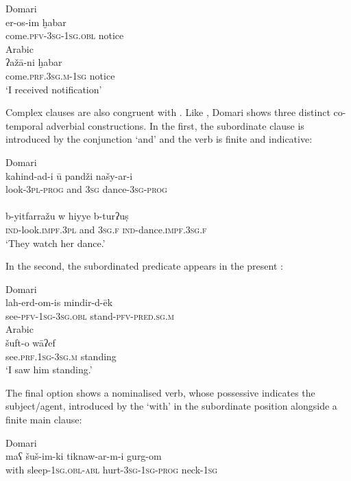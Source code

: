 \documentclass[output=paper]{langsci/langscibook}
\begin{document}
\ea
\ea
{Domari}\\
\gll er-os-im ḫabar    \\
     come.\textsc{pfv-3sg-1sg.obl}  notice\\
\ex
{Arabic}\\
\gll  ʔažā-ni  ḫabar  \\
     come.\textsc{prf.3sg.m-1sg} notice\\
\glt ‘I received notification’
\z
\z

Complex clauses are also congruent with . Like , Domari shows three distinct co-temporal adverbial constructions. In the first, the subordinate clause is introduced by the conjunction ‘and’ and the verb is finite and indicative:

\ea
\ea
{Domari}\\
\gll kahind-ad-i ū pandži našy-ar-i  \\
     look-\textsc{3pl-prog} and \textsc{3sg} dance-\textsc{3sg-prog}\\
     
\\
\gll b-yitfarražu w hiyye b-turʔuṣ  \\
     \textsc{ind}-look.\textsc{impf.3pl} and \textsc{3sg.f} \textsc{ind}-dance.\textsc{impf.3sg.f}\\
\glt ‘They watch her dance.’
\z
\z

In the second, the subordinated predicate appears in the present :

\ea
\ea
{Domari}\\
\gll lah-erd-om-is mindir-d-ēk    \\
       see-\textsc{pfv-1sg-3sg.obl} stand-\textsc{pfv-pred.sg.m}\\
 
\ex
{Arabic}\\
\gll šuft-o   wāʔef    \\
     see.\textsc{prf.1sg-3sg.m} standing\\
\glt ‘I saw him standing.’
\z
\z

The final option shows a nominalised verb, whose possessive  indicates the subject/agent, introduced by the  ‘with’ in the subordinate position alongside a finite main clause:

\ea
\ea
{Domari}\\
\gll maʕ šuš-im-ki tiknaw-ar-m-i gurg-om  \\
       with sleep-\textsc{1sg.obl-abl} hurt-\textsc{3sg-1sg-prog} neck-1\textsc{sg}\\
\end{document}
